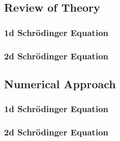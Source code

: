 \documentclass[10pt]{article}
\begin{document}
\subsection*{Review of Theory}

\subsubsection*{1d Schrödinger Equation}





\subsubsection*{2d Schrödinger Equation}




\subsection*{Numerical Approach}

\subsubsection*{1d Schrödinger Equation}




\subsubsection*{2d Schrödinger Equation}



\end{document}
